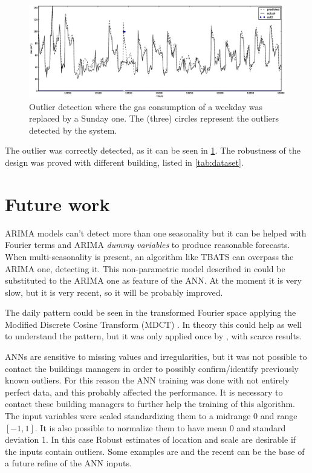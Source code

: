 \documentclass{sig-alternate-sigmod07}
\begin{document}
\begin{figure}
\centering
\includegraphics[width=\textwidth]{images/outliersReal.eps}
\caption{Outlier detection where the gas consumption of a weekday was replaced by a Sunday one. The (three) circles represent the outliers detected by the system.}
\label{fig:outlierReal}
\end{figure}

The outlier was correctly detected, as it can be seen in \cref{fig:outlierReal}. The robustness of the design was proved with different building, listed in \cref{tab:dataset}.


\section{Future work}

ARIMA models can't detect more than one seasonality but it can be helped with Fourier terms and ARIMA \emph{dummy variables} to pro­duce rea­son­able fore­casts. When multi-seasonality is present, an algorithm like TBATS can overpass the ARIMA one, detecting it. This non-parametric model described in \cite{de2011forecasting} could be substituted to the ARIMA one as feature of the ANN. At the moment it is very slow, but it is very recent, so it will be probably improved.

The daily pattern could be seen in the transformed Fourier space applying the Modified Discrete Cosine Transform (MDCT) \cite{malvar1992signal}. In theory this could help as well to understand the pattern, but it was only applied once by  \cite{busseti2012deep}, with scarce results.

ANNs are sensitive to missing values and irregularities, but it was not possible to contact the buildings managers in order to possibly confirm/identify previously known outliers. For this reason the ANN training was done with not entirely perfect data, and this probably affected the performance. It is necessary to contact these building managers to further help the training of this algorithm. \\
The input variables were scaled standardizing them to a midrange 0 and range $[-1, 1]$. It is also possible to normalize them to have mean 0 and standard deviation 1. In this case Robust estimates of location and scale are desirable if the inputs contain outliers. Some examples are \cite{iglewicz1983robust} and the recent \cite{mizera2004location} can be the base of a future refine of the ANN inputs.
\end{document}
